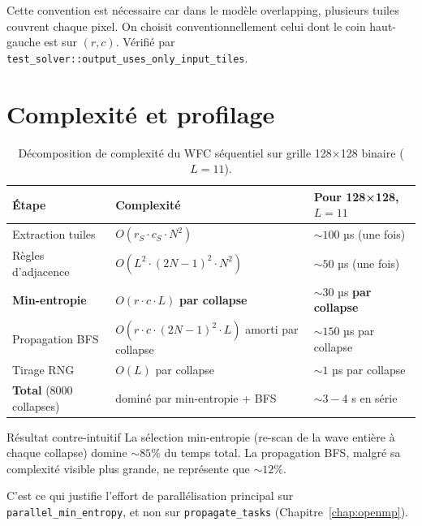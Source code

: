 Cette convention est nécessaire car dans le modèle overlapping, plusieurs tuiles couvrent chaque pixel. On choisit conventionnellement celui dont le coin haut-gauche est sur $(r, c)$. Vérifié par \texttt{test\_solver::output\_uses\_only\_input\_tiles}.

\section{Complexité et profilage}
\label{sec:approche:complexite}

\begin{table}[H]
\centering
\begin{tabular}{lll}
\toprule
\textbf{Étape} & \textbf{Complexité} & \textbf{Pour 128×128, $L = 11$} \\
\midrule
Extraction tuiles & $O(r_S \cdot c_S \cdot N^2)$ & $\sim 100$ µs (une fois) \\
Règles d'adjacence & $O(L^2 \cdot (2N-1)^2 \cdot N^2)$ & $\sim 50$ µs (une fois) \\
\textbf{Min-entropie} & $O(r \cdot c \cdot L)$ \textbf{par collapse} & $\sim 30$ µs \textbf{par collapse} \\
Propagation BFS & $O(r \cdot c \cdot (2N-1)^2 \cdot L)$ amorti par collapse & $\sim 150$ µs par collapse \\
Tirage RNG & $O(L)$ par collapse & $\sim 1$ µs par collapse \\
\midrule
\textbf{Total} (8000 collapses) & dominé par min-entropie + BFS & $\sim 3-4$ s en série \\
\bottomrule
\end{tabular}
\caption{Décomposition de complexité du WFC séquentiel sur grille 128×128 binaire ($L = 11$).}
\label{tab:wfc_complexity}
\end{table}

\begin{important}{Résultat contre-intuitif}
La sélection min-entropie (re-scan de la wave entière à chaque collapse) domine $\sim 85\%$ du temps total. La propagation BFS, malgré sa complexité visible plus grande, ne représente que $\sim 12\%$.

C'est ce qui justifie l'effort de parallélisation principal sur \texttt{parallel\_min\_entropy}, et non sur \texttt{propagate\_tasks} (Chapitre~\ref{chap:openmp}).
\end{important}

